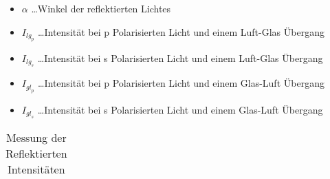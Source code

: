 \documentclass[a4paper]{article}
\begin{document}
\begin{table}
  \centering
  \caption{Messung der Reflektierten Intensitäten}
\begin{itemize}
  \item $\alpha$ \dots Winkel der reflektierten Lichtes
  \item $I_{{lg}_p}$ \dots Intensität bei p Polarisierten Licht und einem Luft-Glas Übergang
  \item $I_{{lg}_s}$ \dots Intensität bei s Polarisierten Licht und einem Luft-Glas Übergang
  \item $I_{{gl}_p}$ \dots Intensität bei p Polarisierten Licht und einem Glas-Luft Übergang
  \item $I_{{gl}_s}$ \dots Intensität bei s Polarisierten Licht und einem Glas-Luft Übergang
\end{itemize}
  \begin{tabular}{|c|c|c|c|c|}
   

\end{tabular}
\end{table}
\end{document}
